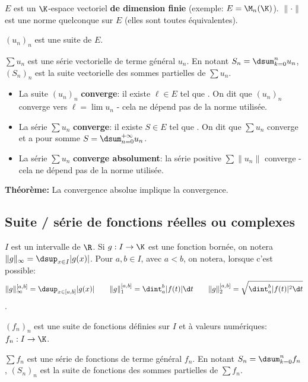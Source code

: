$E$ est un $\K$-espace vectoriel \textbf{de dimension finie}
(exemple: $E=\M_n(\K)$). $\|\cdot\|$ est une norme quelconque sur $E$
(elles sont toutes équivalentes).

\smallskip

$(u_n)_n$ est une suite de $E$.

\smallskip

$\sum u_n$ est une série vectorielle de
terme général $u_n$. En notant 
$S_n=\dsum_{k=0}^nu_n$,
$(S_n)_n$ est la suite vectorielle des sommes partielles de $\sum u_n$.

\smallskip

\begin{itemize}
  \setlength\itemsep{0.6em}
\item La suite $(u_n)_n$ \textbf{converge}: il existe $\ell\in E$ tel que
  . On dit que $(u_n)_n$ converge vers
  $\ell=\lim u_n$ - cela ne dépend pas de la norme utilisée.
\item La série $\sum u_n$ \textbf{converge}: il existe $S\in E$ tel que
  . On dit que $\sum u_n$ converge et a pour
  somme $S=\dsum_{n=0}^{+\infty}u_n$.
\item La série $\sum u_n$ \textbf{converge absolument}: la série positive $\sum
  \|u_n\|$ converge - cela ne dépend pas de la norme utilisée.
\end{itemize}

\smallskip

{\bfseries Théorème:} La convergence absolue implique la convergence.


\subsection*{Suite / série de fonctions réelles ou complexes}

$I$ est un intervalle de $\R$. Si $g:I\to \K$ est une fonction bornée,
on notera $\|g\|_{\infty}=\dsup_{x\in I}|g(x)|$. Pour $a,b\in I$, avec
$a<b$, on notera, lorsque c'est possible:
\[ \|g\|_{\infty}^{[a,b]}=\dsup_{x\in [a,b]}|g(x)|\qquad
\|g\|_1^{[a,b]}=\dint_a^b|f(t)|\d t\qquad
\|g\|_2^{[a,b]}=\sqrt{\dint_a^b|f(t)|^2\d t}\]
.

\smallskip

$(f_n)_n$ est une suite de fonctions définies sur $I$ et à valeurs
numériques: $f_n:I\to\K$.

\smallskip

$\sum f_n$ est 
une série de fonctions de terme général $f_n$. En notant 
$S_n=\dsum_{k=0}^nf_n$,
$(S_n)_n$ est la suite de fonctions des sommes partielles de $\sum
f_n$.

